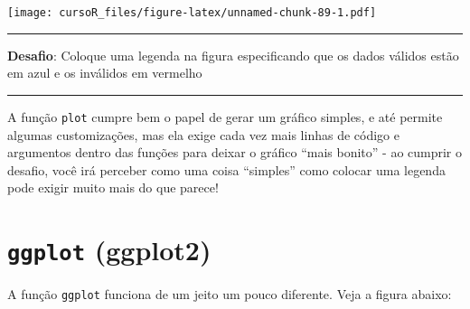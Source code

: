 \documentclass[]{book}
\newenvironment{Shaded}{\begin{snugshade}}{\end{snugshade}}
\newcommand{\KeywordTok}[1]{\textcolor[rgb]{0.13,0.29,0.53}{\textbf{#1}}}
\newcommand{\DataTypeTok}[1]{\textcolor[rgb]{0.13,0.29,0.53}{#1}}
\newcommand{\DecValTok}[1]{\textcolor[rgb]{0.00,0.00,0.81}{#1}}
\newcommand{\StringTok}[1]{\textcolor[rgb]{0.31,0.60,0.02}{#1}}
\newcommand{\OperatorTok}[1]{\textcolor[rgb]{0.81,0.36,0.00}{\textbf{#1}}}
\newcommand{\NormalTok}[1]{#1}
\theoremstyle{definition}
\theoremstyle{definition}
\theoremstyle{definition}
\theoremstyle{remark}
\begin{document}
\begin{Shaded}
\end{Shaded}

\texttt{[image: cursoR\_files/figure-latex/unnamed-chunk-89-1.pdf]}

\begin{center}\rule{0.5\linewidth}{\linethickness}\end{center}

{\textbf{Desafio}: Coloque uma legenda na figura especificando que os
dados válidos estão em azul e os inválidos em vermelho }

\begin{center}\rule{0.5\linewidth}{\linethickness}\end{center}

A função \texttt{plot} cumpre bem o papel de gerar um gráfico simples, e
até permite algumas customizações, mas ela exige cada vez mais linhas de
código e argumentos dentro das funções para deixar o gráfico ``mais
bonito'' - ao cumprir o desafio, você irá perceber como uma coisa
``simples'' como colocar uma legenda pode exigir muito mais do que
parece!

\section{\texorpdfstring{\texttt{ggplot}
(ggplot2)}{ggplot (ggplot2)}}\label{ggplot-ggplot2}

A função \texttt{ggplot} funciona de um jeito um pouco diferente. Veja a
figura abaixo:
\end{document}
